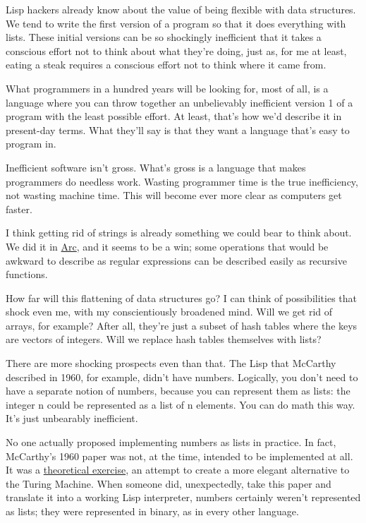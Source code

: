 Lisp hackers already know about the value of being flexible
with data structures.  We tend to write the first version of
a program so that it does everything with lists.  These
initial versions can be so shockingly inefficient that it
takes a conscious effort not to think about what they're
doing, just as, for me at least, eating a steak requires a
conscious effort not to think where it came from.

What programmers in a hundred years will be looking for, most of
all, is a language where you can throw together an unbelievably
inefficient version 1 of a program with the least possible
effort.  At least, that's how we'd describe it in present-day
terms.  What they'll say is that they want a language that's
easy to program in.

Inefficient software isn't gross.  What's gross is a language
that makes programmers do needless work.  Wasting programmer time
is the true inefficiency, not wasting machine time.  This will
become ever more clear as computers get faster.



I think getting rid of strings is already something we
could bear to think about.  We did it in \href{http://www.paulgraham.com/arc.html}{Arc}, and it seems
to be a win;  some operations that would be awkward to
describe as regular expressions can be described
easily as recursive functions.

How far will this flattening of data structures go?  I can think
of possibilities that shock even me, with my conscientiously broadened
mind.  Will we get rid of arrays, for example?  After all, they're
just a subset of hash tables where the keys are vectors of
integers.   Will we replace hash tables themselves with lists?

There are more shocking prospects even than that.  The Lisp
that McCarthy described in 1960, for example, didn't
have numbers.  Logically, you don't need to have a separate notion
of numbers, because you can represent them as lists:  the integer
n could be represented as a list of n elements.  You can do math this
way.  It's just unbearably inefficient.

No one actually proposed implementing numbers as lists in
practice.  In fact, McCarthy's 1960 paper was not, at the time,
intended to be implemented at all.  It was a \href{http://www.paulgraham.com/rootsoflisp.html}{theoretical exercise},
an attempt to create a more elegant alternative to the Turing
Machine.  When someone did, unexpectedly, take this paper and
translate it into a working Lisp interpreter, numbers certainly
weren't represented as lists; they were represented in binary,
as in every other language.

